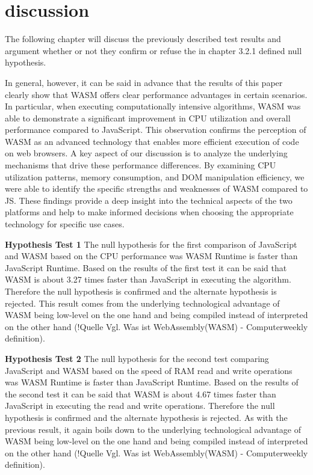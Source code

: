 \newpage
\section{discussion} \label{discussion}
The following chapter will discuss the previously described test results and argument whether or not they confirm or refuse the in chapter 3.2.1 defined null hypothesis. 

In general, however, it can be said in advance that the results of this paper clearly show that WASM offers clear performance advantages in certain scenarios. In particular, when executing computationally intensive algorithms, WASM was able to demonstrate a significant improvement in CPU utilization and overall performance compared to JavaScript. This observation confirms the perception of WASM as an advanced technology that enables more efficient execution of code on web browsers. 
A key aspect of our discussion is to analyze the underlying mechanisms that drive these performance differences. By examining CPU utilization patterns, memory consumption, and DOM manipulation efficiency, we were able to identify the specific strengths and weaknesses of WASM compared to JS. These findings provide a deep insight into the technical aspects of the two platforms and help to make informed decisions when choosing the appropriate technology for specific use cases.

\textbf{Hypothesis Test 1} \newline
The null hypothesis for the first comparison of JavaScript and WASM based on the CPU performance was \dq WASM Runtime is faster than JavaScript Runtime\dq . Based on the results of the first test it can be said that WASM is about 3.27 times faster than JavaScript in executing the algorithm. Therefore the null hypothesis is confirmed and the alternate hypothesis is rejected. This result comes from the underlying technological advantage of WASM being low-level on the one hand and being compiled instead of interpreted on the other hand (!Quelle Vgl. Was ist WebAssembly(WASM) - Computerweekly definition).

\textbf{Hypothesis Test 2} \newline
The null hypothesis for the second test comparing JavaScript and WASM based on the speed of RAM read and write operations was \dq WASM Runtime is faster than JavaScript Runtime\dq . Based on the results of the second test it can be said that WASM is about 4.67 times faster than JavaScript in executing the read and write operations. Therefore the null hypothesis is confirmed and the alternate hypothesis is rejected. As with the previous result, it again boils down to the underlying technological advantage of WASM being low-level on the one hand and being compiled instead of interpreted on the other hand (!Quelle Vgl. Was ist WebAssembly(WASM) - Computerweekly definition).

